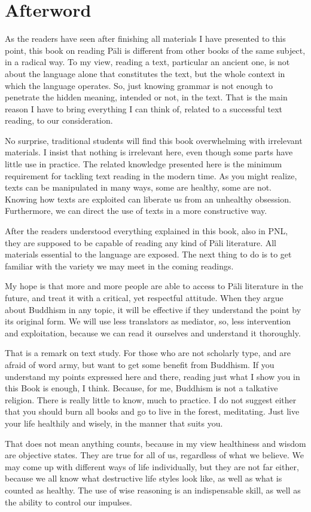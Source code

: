 \cleardoublepage
{}
{}
\chapter*{Afterword}\label{chap:afterword}

As the readers have seen after finishing all materials I have presented to this point, this book on reading P\=ali is different from other books of the same subject, in a radical way. To my view, reading a text, particular an ancient one, is not about the language alone that constitutes the text, but the whole context in which the language operates. So, just knowing grammar is not enough to penetrate the hidden meaning, intended or not, in the text. That is the main reason I have to bring everything I can think of, related to a successful text reading, to our consideration.

No surprise, traditional students will find this book overwhelming with irrelevant materials. I insist that nothing is irrelevant here, even though some parts have little use in practice. The related knowledge presented here is the minimum requirement for tackling text reading in the modern time. As you might realize, texts can be manipulated in many ways, some are healthy, some are not. Knowing how texts are exploited can liberate us from an unhealthy obsession. Furthermore, we can direct the use of texts in a more constructive way.

After the readers understood everything explained in this book, also in PNL, they are supposed to be capable of reading any kind of P\=ali literature. All materials essential to the language are exposed. The next thing to do is to get familiar with the variety we may meet in the coming readings.

My hope is that more and more people are able to access to P\=ali literature in the future, and treat it with a critical, yet respectful attitude. When they argue about Buddhism in any topic, it will be effective if they understand the point by its original form. We will use less translators as mediator, so, less intervention and exploitation, because we can read it ourselves and understand it thoroughly.

That is a remark on text study. For those who are not scholarly type, and are afraid of word army, but want to get some benefit from Buddhism. If you understand my points expressed here and there, reading just what I show you in this Book is enough, I think. Because, for me, Buddhism is not a talkative religion. There is really little to know, much to practice. I do not suggest either that you should burn all books and go to live in the forest, meditating. Just live your life healthily and wisely, in the manner that suits you.

That does not mean anything counts, because in my view healthiness and wisdom are objective states. They are true for all of us, regardless of what we believe. We may come up with different ways of life individually, but they are not far either, because we all know what destructive life styles look like, as well as what is counted as healthy. The use of wise reasoning is an indispensable skill, as well as the ability to control our impulses.
